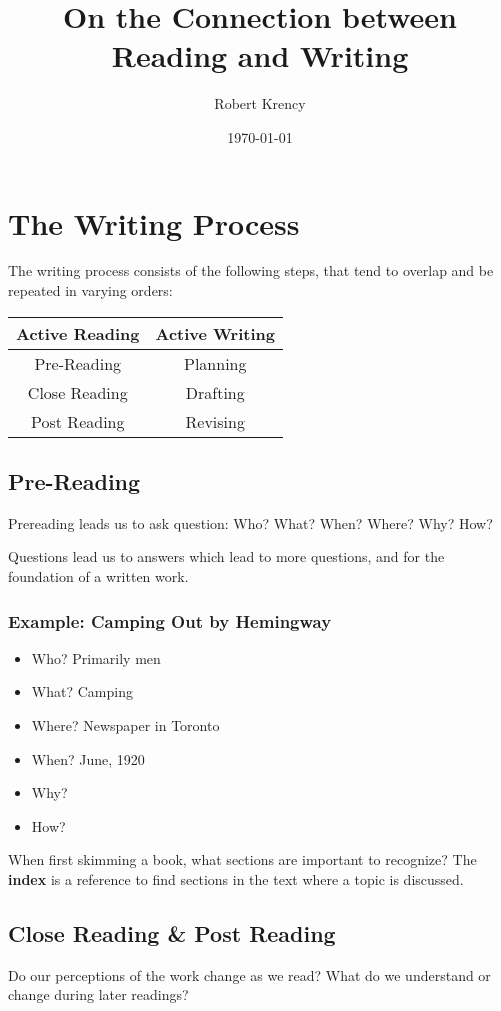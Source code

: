 \documentclass[12pt]{article}
\title{On the Connection between Reading and Writing}
\author{Robert Krency}
\date{\today}
\begin{document}
\section{The Writing Process}

The writing process consists of the following steps, that tend to overlap and be repeated in varying orders:
\begin{tabular}{c | c}
    Active Reading & Active Writing \\ \hline
    Pre-Reading & Planning \\
    Close Reading & Drafting \\
    Post Reading & Revising \\
\end{tabular}

\subsection{Pre-Reading}

Prereading leads us to ask question: Who? What? When? Where? Why? How?

Questions lead us to answers which lead to more questions, and for the foundation of a written work.

\subsubsection{Example: Camping Out by Hemingway}

\begin{itemize}
    \item Who? Primarily men
    \item What? Camping
    \item Where? Newspaper in Toronto
    \item When? June, 1920
    \item Why?
    \item How?
\end{itemize}

When first skimming a book, what sections are important to recognize?
The \textbf{index} is a reference to find sections in the text where a topic is discussed.


\subsection{Close Reading & Post Reading}

Do our perceptions of the work change as we read?
What do we understand or change during later readings?
\end{document}

